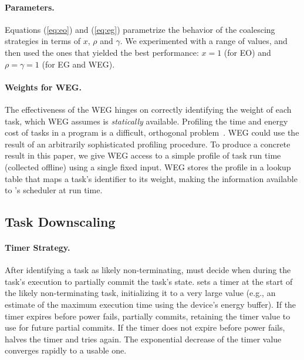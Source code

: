 \paragraph{Parameters.}
Equations (\ref{eq:eo}) and (\ref{eq:eg}) parametrize the behavior of the coalescing strategies in terms of $x$, $\rho$ and $\gamma$.
We experimented with a range of values, and then used the ones that yielded the best performance: $x = 1$ (for EO) and $\rho = \gamma = 1$ (for EG and WEG).

\paragraph{Weights for WEG.}
The effectiveness of the WEG hinges on correctly identifying the weight of each task, which WEG assumes is {\em statically} available. Profiling the time and energy cost of tasks in a program is a difficult, orthogonal problem~\cite{cleancut_2018,baghsorkhi_cgo_2018}. WEG could use the result of an arbitrarily sophisticated profiling procedure. To produce a concrete result in this paper, we give WEG access to a simple profile of task run time (collected offline) using a single fixed input. WEG stores the profile in a lookup table that maps a task's identifier to its weight, making the information available to \sys's scheduler at run time.

%
\subsection{Task Downscaling}
%
%
\paragraph{Timer Strategy.}
After identifying a task as likely non-terminating, \sys must decide when during the task's execution to partially commit the task's state. \sys sets a timer at the start of the likely non-terminating task, initializing it to a very large value (e.g., an estimate of the maximum execution time using the device's energy buffer). If the timer expires before power fails, \sys partially commits, retaining  the timer value to use for future partial commits. If the timer does not expire before power fails, \sys halves the timer and tries again. The exponential decrease of the timer value converges rapidly to a usable one.
%


